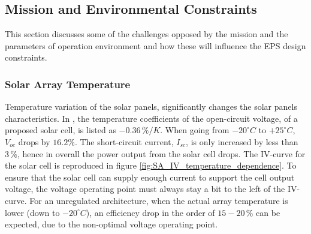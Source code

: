\subsection{Mission and Environmental Constraints}
\label{subsec:environmental_requirements}
This section discusses some of the challenges opposed by the mission and the parameters of operation environment and how these will influence the \ac{EPS} design constraints.
%
\subsubsection*{Solar Array Temperature}
Temperature variation of the solar panels, significantly changes the solar panels characteristics. In \cite{MC_Solar_Cell}, the temperature coefficients of the open-circuit voltage, of a proposed solar cell, is listed as $-0.36\,\%/K$. When going from $-20^{\circ}C$ to $+25^{\circ}C$, $V_{oc}$ drops by $16.2\%$. The short-circuit current, $I_{sc}$, is only increased by less than $3\,\%$, hence in overall the power output from the solar cell drops. The IV-curve for the solar cell is reproduced in figure \ref{fig:SA_IV_temperature_dependence}. To ensure that the solar cell can supply enough current to support the cell output voltage, the voltage operating point must always stay a bit to the left of the IV-curve. For an unregulated architecture, when the actual array temperature is lower (down to $-20^{\circ}C$), an efficiency drop in the order of $15-20\,\%$ can be expected, due to the non-optimal voltage operating point.
%
